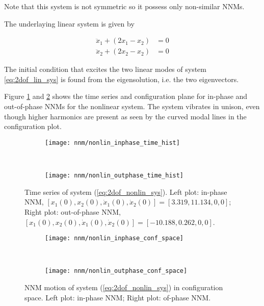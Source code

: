 Note that this system is not symmetric so it possess only non-similar NNMs.


The underlaying linear system is given by

\begin{equation}
  \label{eq:2dof_lin_sys}
  \begin{aligned}
    \ddot x_1 + (2x_1 - x_2) &= 0 \\
    \ddot x_2 + (2x_2 - x_2) &= 0
  \end{aligned}
\end{equation}

The initial condition that excites the two linear modes of system
\eqref{eq:2dof_lin_sys} is found from the eigensolution, i.e. the two
eigenvectors.


Figure \ref{fig:nonlin_time_series} and \ref{fig:nonlin_nnm_config} shows the
time series and configuration plane for in-phase and out-of-phase NNMs for the
nonlinear system. The system vibrates in unison, even though higher harmonics
are present as seen by the curved modal lines in the configuration plot.


\begin{figure}[!ht]
  \centering
  \begin{subfigure}[b]{0.45\textwidth}
    \texttt{[image: nnm/nonlin\_inphase\_time\_hist]}
  \end{subfigure}
  ~
  \begin{subfigure}[b]{0.45\textwidth}
    \texttt{[image: nnm/nonlin\_outphase\_time\_hist]}
  \end{subfigure}
  \caption{Time series of system (\ref{eq:2dof_nonlin_sys}).
    Left plot: in-phase NNM,
    $[x_1(0), x_2(0), \dot x_1(0), \dot x_2(0)] = [3.319, 11.134,0,0]$;
    Right plot: out-of-phase NNM,
    $[x_1(0), x_2(0), \dot x_1(0), \dot x_2(0)] = [-10.188, 0.262,0,0]$.}
  \label{fig:nonlin_time_series}
\end{figure}

\begin{figure}[!ht]
  \centering
  \begin{subfigure}[b]{0.45\textwidth}
    \texttt{[image: nnm/nonlin\_inphase\_conf\_space]}
  \end{subfigure}
  ~
  \begin{subfigure}[b]{0.45\textwidth}
    \texttt{[image: nnm/nonlin\_outphase\_conf\_space]}
  \end{subfigure}
  \caption{NNM motion of system (\ref{eq:2dof_nonlin_sys}) in configuration space.
    Left plot: in-phase NNM;
    Right plot: of-phase NNM.}
  \label{fig:nonlin_nnm_config}
\end{figure}



